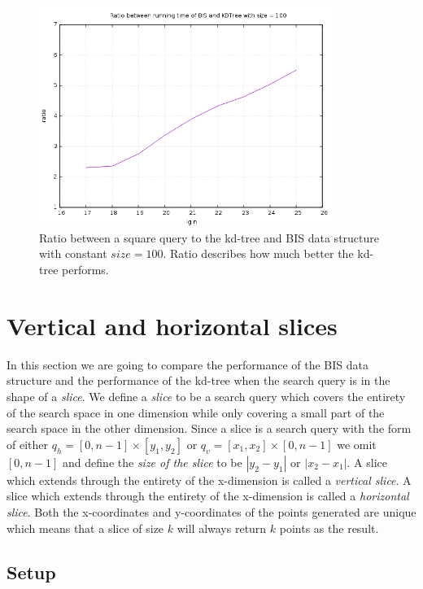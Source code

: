 \begin{figure}[h]
    \centering
    \includegraphics[width = 0.85\textwidth]{pictures/analysis/factor_difference_sqrtn_100.png}
    \caption{Ratio between a square query to the kd-tree and BIS data structure with constant $size = 100$. Ratio describes how much better the kd-tree performs.}\label{fig:factdiffsqrt100}
\end{figure}

\clearpage


\section{Vertical and horizontal slices}
\label{sect:slices}

In this section we are going to compare the performance of the BIS data structure and the performance of the kd-tree when the search query is in the shape of a \emph{slice}. We define a \emph{slice} to be a search query which covers the entirety of the search space in one dimension while only covering a small part of the search space in the other dimension. Since a slice is a search query with the form of either $q_h = [0, n-1] \times [y_1, y_2]$ or $q_v = [x_1, x_2] \times [0, n-1]$ we omit $[0, n-1]$ and define the \emph{size of the slice} to be $\left| y_2-y_1\right|$ or $\left|x_2-x_1\right|$. A slice which extends through the entirety of the x-dimension is called a \emph{vertical slice}. A slice which extends through the entirety of the x-dimension is called a \emph{horizontal slice}. Both the x-coordinates and y-coordinates of the points generated are unique which means that a slice of size $k$ will always return $k$ points as the result.

\subsection{Setup}


